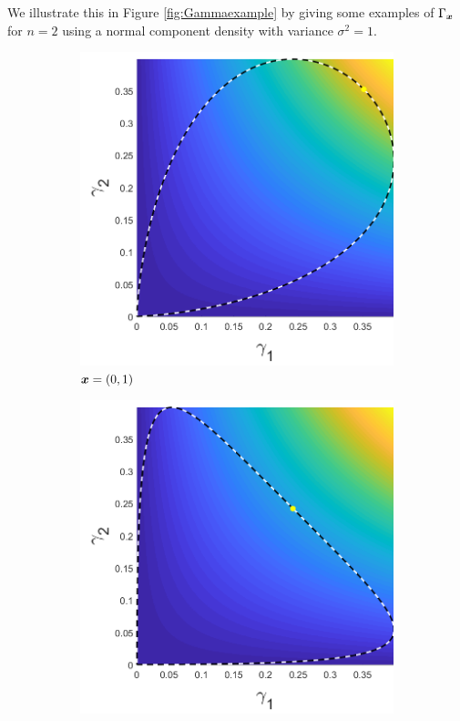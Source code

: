 	We illustrate this in Figure \ref{fig:Gammaexample} by giving some examples of $\Gamma_{\bm{{x}}}$ for $n=2$ using a normal component density with variance $\sigma^2 = 1$. 
	\begin{figure}[ht]
		\begin{subfigure}[t]{0.32\textwidth}
			\centering
			\includegraphics[width = \textwidth]{Sigma1x1_0-x2_1}
			\caption{${\bm{{x}}} = (0,1)$} \label{subfig:gammaexamplea}
		\end{subfigure}
		\begin{subfigure}[t]{0.32\textwidth}
			\centering
			\includegraphics[width = \textwidth]{Sigma1x1_0-x2_2}

\end{subfigure}
\end{figure}
